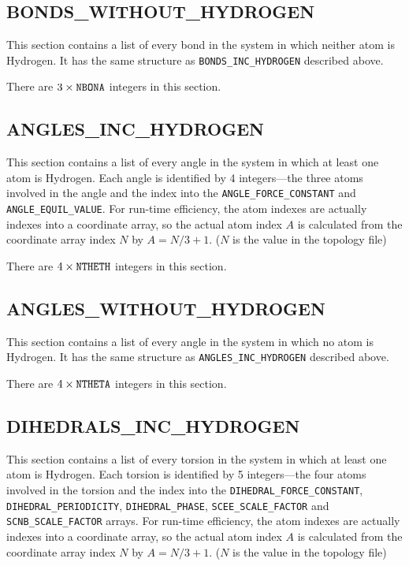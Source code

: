 \subsection*{BONDS\_WITHOUT\_HYDROGEN}

This section contains a list of every bond in the system in which neither atom
is Hydrogen. It has the same structure as {\tt BONDS\_INC\_HYDROGEN} described
above.


\noindent There are $3 \times {\tt NBONA}$ integers in this section.

\subsection*{ANGLES\_INC\_HYDROGEN}

This section contains a list of every angle in the system in which at least one
atom is Hydrogen. Each angle is identified by 4 integers---the three atoms
involved in the angle and the index into the {\tt ANGLE\_FORCE\_CONSTANT} and
{\tt ANGLE\_EQUIL\_VALUE}. For run-time efficiency, the atom indexes are
actually indexes into a coordinate array, so the actual atom index $A$ is
calculated from the coordinate array index $N$ by $A = N / 3 + 1$. ($N$ is the
value in the topology file)


\noindent There are $4 \times {\tt NTHETH}$ integers in this section.

\subsection*{ANGLES\_WITHOUT\_HYDROGEN}

This section contains a list of every angle in the system in which no atom is
Hydrogen. It has the same structure as {\tt ANGLES\_INC\_HYDROGEN} described
above.


\noindent There are $4 \times {\tt NTHETA}$ integers in this section.

\subsection*{DIHEDRALS\_INC\_HYDROGEN}

This section contains a list of every torsion in the system in which at least
one atom is Hydrogen. Each torsion is identified by 5 integers---the four atoms
involved in the torsion and the index into the {\tt DIHEDRAL\_FORCE\_CONSTANT},
{\tt DIHEDRAL\_PERIODICITY}, {\tt DIHEDRAL\_PHASE}, {\tt SCEE\_SCALE\_FACTOR}
and {\tt SCNB\_SCALE\_FACTOR} arrays. For run-time efficiency, the atom indexes
are actually indexes into a coordinate array, so the actual atom index $A$ is
calculated from the coordinate array index $N$ by $A = N / 3 + 1$. ($N$ is the
value in the topology file)

